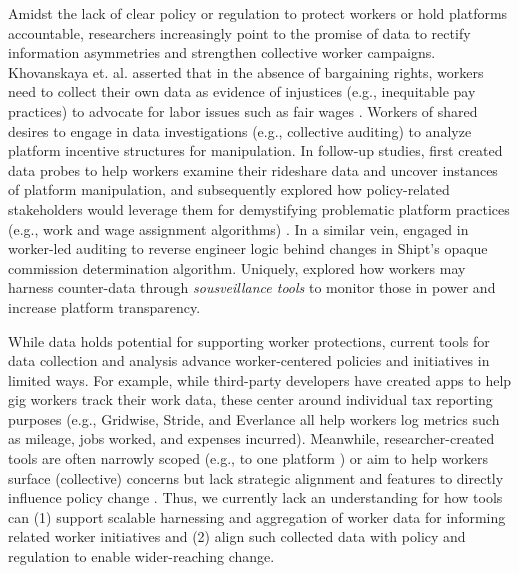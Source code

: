 {Amidst the lack of clear policy or regulation to protect workers or hold platforms accountable, researchers increasingly point} to the {promise} of data to rectify information {asymmetries} and strengthen {collective worker} campaigns. 
Khovanskaya et. al. asserted that in the absence of bargaining rights, workers need to collect their own data {as evidence of injustices (e.g., inequitable pay practices)} to advocate for labor issues such as fair wages \cite{DjK8}. 
Workers of \citet{TdXv} shared desires to engage in data investigations (e.g., collective auditing) to analyze platform incentive structures for manipulation. 
In follow-up studies, \citet{zhang2023stakeholder} {first} created data probes {to help workers examine their rideshare data and uncover instances} of platform manipulation{, and subsequently explored how policy-related stakeholders would leverage them for demystifying problematic platform practices (e.g., work and wage assignment algorithms) \cite{policy_probes}}. {In a similar vein,} \citet{6B4U} engaged in worker-led auditing to reverse engineer logic behind changes in {Shipt's} {opaque} commission determination algorithm. 
{Uniquely,} \citet{sousveillance} {explored how workers may harness counter-data through \textit{sousveillance tools} to monitor those in power and increase platform transparency}. 

{While data holds potential for supporting worker protections, current tools for data collection and analysis advance worker-centered policies and initiatives in limited ways. For example, while third-party developers have created apps to help gig workers track their work data, these center around individual tax reporting purposes (e.g., Gridwise, Stride, and Everlance all help workers log metrics such as mileage, jobs worked, and expenses incurred). Meanwhile, researcher-created tools are often narrowly scoped (e.g., to one platform \cite{6B4U}) or aim to help workers surface (collective) concerns but lack strategic alignment and features to directly influence policy change \cite{zhang2023stakeholder, weclock, savage2024unveiling}. Thus, we currently lack an understanding for how tools can (1) support scalable harnessing and aggregation of worker data for informing related worker initiatives and (2) align such collected data with policy and regulation to enable wider-reaching change.} 


